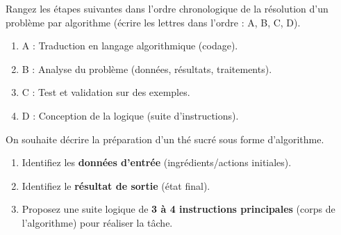 \documentclass[11pt]{article}
\begin{document}
\begin{exercice}
Rangez les étapes suivantes dans l'ordre chronologique de la résolution d'un problème par algorithme (écrire les lettres dans l'ordre : A, B, C, D).
\begin{enumerate}
    \item A : Traduction en langage algorithmique (codage).
    \item B : Analyse du problème (données, résultats, traitements).
    \item C : Test et validation sur des exemples.
    \item D : Conception de la logique (suite d'instructions).
\end{enumerate}
\end{exercice}

\begin{exercice}
On souhaite décrire la préparation d'un thé sucré sous forme d'algorithme.
\begin{enumerate}
    \item Identifiez les \textbf{données d'entrée} (ingrédients/actions initiales).
    \item Identifiez le \textbf{résultat de sortie} (état final).
    \item Proposez une suite logique de \textbf{3 à 4 instructions principales} (corps de l'algorithme) pour réaliser la tâche.
\end{enumerate}
\end{exercice}
\end{document}
